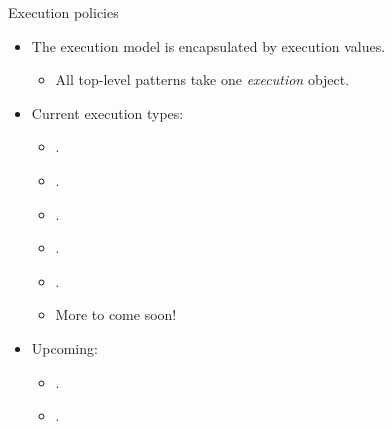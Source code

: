 \begin{frame}[t]{Execution policies}
\begin{itemize}
  \item The execution model is encapsulated by execution values.
    \begin{itemize}
      \item All top-level patterns take one \emph{execution} object.
    \end{itemize}
  \vfill
  \item Current execution types:
    \begin{itemize}
      \item {}.
      \item {}.
      \item {}.
      \item {}.
      \item {}.
      \item More to come soon!
    \end{itemize}
  \vfill
  \item Upcoming:
    \begin{itemize}
      \item {}.
      \item {}.
    \end{itemize}
  \vfill
\end{itemize}
\end{frame}

